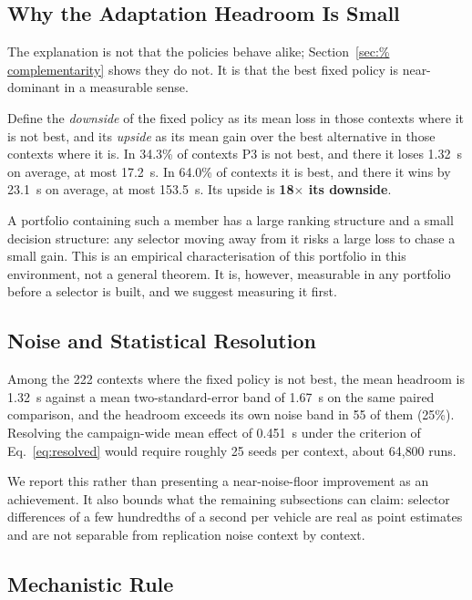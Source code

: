 \documentclass[runningheads]{llncs}
\begin{document}
\subsection{Why the Adaptation Headroom Is Small}
\label{sec:asymmetry}

The explanation is not that the policies behave alike; Section~\ref{sec:%
complementarity} shows they do not. It is that the best fixed policy is
near-dominant in a measurable sense.

Define the \emph{downside} of the fixed policy as its mean loss in those
contexts where it is not best, and its \emph{upside} as its mean gain over the
best alternative in those contexts where it is. In 34.3\% of
contexts P3 is not best, and there it loses 1.32~s on
average, at most 17.2~s. In 64.0\% of contexts it is best,
and there it wins by 23.1~s on average, at most 153.5~s.
Its upside is \textbf{18$\times$ its downside}.

A portfolio containing such a member has a large ranking structure and a small
decision structure: any selector moving away from it risks a large loss to
chase a small gain. This is an empirical characterisation of this portfolio in
this environment, not a general theorem. It is, however, measurable in any
portfolio before a selector is built, and we suggest measuring it first.

\subsection{Noise and Statistical Resolution}

Among the 222 contexts where the fixed policy is not best, the
mean headroom is 1.32~s against a mean two-standard-error band
of 1.67~s on the same paired comparison, and the headroom exceeds
its own noise band in 55 of them (25\%).
Resolving the campaign-wide mean effect of 0.451~s under the
criterion of Eq.~\ref{eq:resolved} would require roughly
25 seeds per context, about 64{,}800 runs.

We report this rather than presenting a near-noise-floor improvement as an
achievement. It also bounds what the remaining subsections can claim: selector
differences of a few hundredths of a second per vehicle are real as point
estimates and are not separable from replication noise context by context.

\subsection{Mechanistic Rule}
\end{document}

